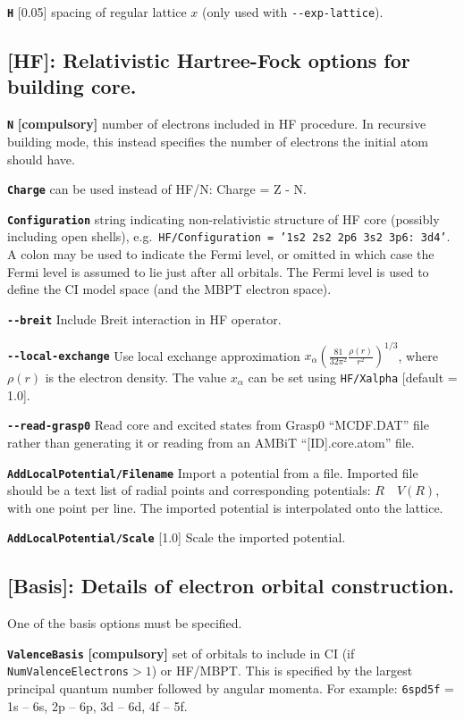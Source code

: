 \documentclass[a4paper,11pt]{article}
\newcommand{\option}[1]{\smallskip\noindent\textbf{\texttt{#1}}}
\newcommand{\code}[1]{\texttt{#1}}
\begin{document}
\option{H} [0.05] spacing of regular lattice $x$ (only used with \texttt{-{}-exp-lattice}).

\subsection{[HF]: Relativistic Hartree-Fock options for building core.}

\option{N} \textbf{[compulsory]} number of electrons included in HF procedure. In recursive building mode, this instead specifies the number of electrons the initial atom should have.

\option{Charge} can be used instead of HF/N: Charge = Z - N.

\option{Configuration} string indicating non-relativistic structure of HF core (possibly including open shells), e.g.~\texttt{HF/Configuration = '1s2 2s2 2p6 3s2 3p6: 3d4'}. A colon may be used to indicate the Fermi level, or omitted in which case the Fermi level is assumed to lie just after all orbitals. The Fermi level is used to define the CI model space (and the MBPT electron space).

\option{-{}-breit} Include Breit interaction in HF operator.

\option{-{}-local-exchange} Use local exchange approximation $x_\alpha \left(\frac{81}{32\pi^2} \frac{\rho(r)}{r^2}\right)^{1/3}$, where $\rho(r)$ is the electron density. The value $x_\alpha$ can be set using \code{HF/Xalpha} [default = 1.0].

\option{-{}-read-grasp0} Read core and excited states from Grasp0 ``MCDF.DAT'' file rather than generating it or reading from an AMBiT ``[ID].core.atom'' file.

\option{AddLocalPotential/Filename} Import a potential from a file. Imported file should be a text list of radial points and corresponding potentials: $R \quad V(R)$, with one point per line. The imported potential is interpolated onto the lattice.

\option{AddLocalPotential/Scale} [1.0] Scale the imported potential.

\subsection{[Basis]: Details of electron orbital construction.}
One of the basis options must be specified.

\option{ValenceBasis} \textbf{[compulsory]} set of orbitals to include in CI (if \mbox{\texttt{NumValenceElectrons}$>1$}) or HF/MBPT. This is specified by the largest principal quantum number followed by angular momenta. For example:
\texttt{6spd5f} = 1s -- 6s, 2p -- 6p, 3d -- 6d, 4f -- 5f.
\end{document}
